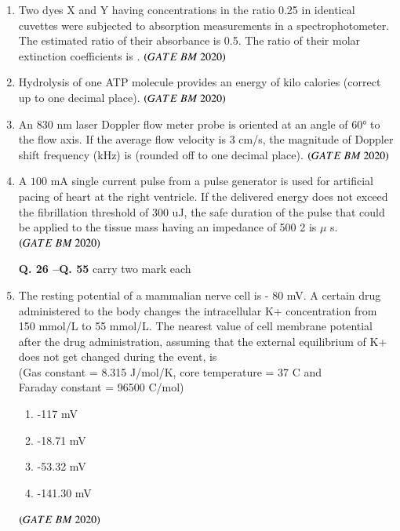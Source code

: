 \documentclass[journal,12pt,onecolumn]{IEEEtran}
\theoremstyle{remark}
\begin{document}
\begin{enumerate}
\item Two dyes X and Y having concentrations in the ratio 0.25 in identical cuvettes were
subjected to absorption measurements in a spectrophotometer. The estimated ratio
of their absorbance is 0.5. The ratio of their molar extinction coefficients is \underline{\hspace{2cm}}.  \hfill $\brak{GATE\ BM\ 2020}$

\item Hydrolysis of one ATP molecule provides an energy of \underline{\hspace{2cm}} kilo calories (correct up to one decimal place). \hfill $\brak{GATE\ BM\ 2020}$

\item An 830 nm laser Doppler flow meter probe is oriented at an angle of 60° to the flow
axis. If the average flow velocity is 3 cm/s, the magnitude of Doppler shift
frequency (kHz) is \underline{\hspace{2cm}} (rounded off to one decimal place).  \hfill $\brak{GATE\ BM\ 2020}$

\item A $100$ mA single current pulse from a pulse generator is used for artificial pacing of
heart at the right ventricle. If the delivered energy does not exceed the fibrillation
threshold of $300$ uJ, the safe duration of the pulse that could be applied to the tissue
mass having an impedance of 500 2 is \underline{\hspace{2cm}} $\mu$ s.  \hfill $\brak{GATE\ BM\ 2020}$

\noindent \textbf{Q. 26 --Q.  \textbf{55}} carry two mark each

\item The resting potential of a mammalian nerve cell is - 80 mV. A certain drug
administered to the body changes the intracellular K+ concentration from 150
mmol/L to 55 mmol/L. The nearest value of cell membrane potential after the
drug administration, assuming that the external equilibrium of K+ does not get
changed during the event, is \\

(Gas constant = 8.315 J/mol/K, core temperature = 37 C and\\

Faraday constant = 96500 C/mol)
\begin{enumerate}[label=\alph*)] 
\item\hspace{0.5cm}-117 mV
\item\hspace{0.5cm}-18.71 mV
\item\hspace{0.5cm}-53.32 mV
\item\hspace{0.5cm}-141.30 mV
\end{enumerate}
\hfill $\brak{GATE\ BM\ 2020}$


\end{enumerate}
\end{document}

